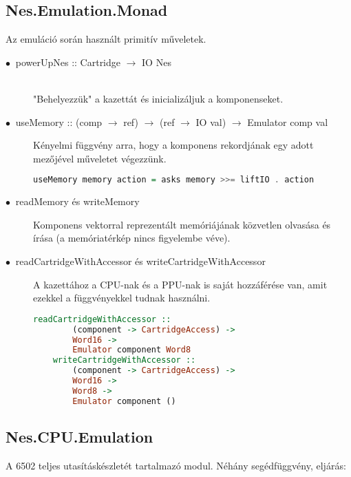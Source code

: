 \subsection{Nes.Emulation.Monad}
Az emuláció során használt primitív műveletek.
\begin{description}
	\item[$\bullet\:$ powerUpNes :: Cartridge $\rightarrow$ IO Nes] \hfill \\
	"Behelyezzük" a kazettát és inicializáljuk a komponenseket. 
	\item[$\bullet\:$ useMemory :: (comp $\rightarrow$ ref) $\rightarrow$ (ref $\rightarrow$ IO val) $\rightarrow$ Emulator comp val]
	Kényelmi függvény arra, hogy a komponens rekordjának egy adott mezőjével műveletet végezzünk.
	\begin{lstlisting}[language=Haskell]
	useMemory memory action = asks memory >>= liftIO . action
	\end{lstlisting}
	\item[$\bullet\:$ readMemory és writeMemory]
	Komponens vektorral reprezentált memóriájának közvetlen olvasása és írása (a memóriatérkép nincs figyelembe véve).
	\item[$\bullet\:$ readCartridgeWithAccessor és writeCartridgeWithAccessor]
	A kazettához a CPU-nak és a PPU-nak is saját hozzáférése van, amit ezekkel a függvényekkel tudnak használni.
	\begin{lstlisting}[language=Haskell, basicstyle=\scriptsize]
	readCartridgeWithAccessor :: 
		(component -> CartridgeAccess) -> 
		Word16 -> 
		Emulator component Word8
	writeCartridgeWithAccessor ::
		(component -> CartridgeAccess) -> 
		Word16 ->
		Word8 -> 
		Emulator component ()
	\end{lstlisting}
\end{description}

\subsection{Nes.CPU.Emulation}
A 6502 teljes utasításkészletét tartalmazó modul. Néhány segédfüggvény, eljárás:

